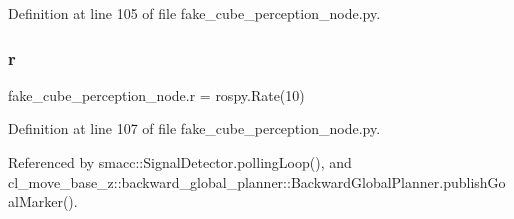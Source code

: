 Definition at line 105 of file fake\+\_\+cube\+\_\+perception\+\_\+node.\+py.

\mbox{\label{namespacefake__cube__perception__node_a36e88703ab69fd35065e8a8d9344903e}} 
\subsubsection{\texorpdfstring{r}{r}}
{\footnotesize\ttfamily fake\+\_\+cube\+\_\+perception\+\_\+node.\+r = rospy.\+Rate(10)}



Definition at line 107 of file fake\+\_\+cube\+\_\+perception\+\_\+node.\+py.



Referenced by smacc\+::\+Signal\+Detector.\+polling\+Loop(), and cl\+\_\+move\+\_\+base\+\_\+z\+::backward\+\_\+global\+\_\+planner\+::\+Backward\+Global\+Planner.\+publish\+Goal\+Marker().

